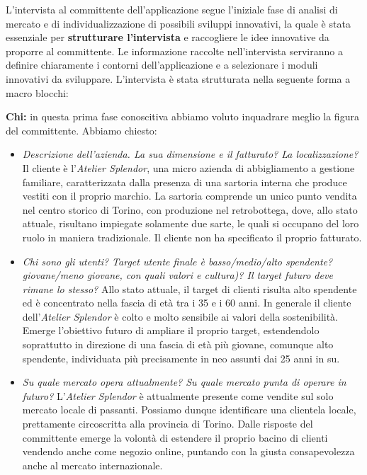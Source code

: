 \documentclass[12pt]{article}
\begin{document}
L'intervista al committente dell'applicazione segue l'iniziale fase di analisi di mercato e di individualizzazione di possibili sviluppi innovativi, la quale è stata essenziale per \textbf{strutturare l'intervista} e raccogliere le idee innovative da proporre al committente. Le informazione raccolte nell'intervista serviranno a definire chiaramente i contorni dell'applicazione e a selezionare i moduli innovativi da sviluppare. L'intervista è stata strutturata nella seguente forma a macro blocchi:


\textbf{Chi:} in questa prima fase conoscitiva abbiamo voluto inquadrare meglio la figura del committente. Abbiamo chiesto:
\begin{itemize}
    \item {\em Descrizione dell'azienda. La sua dimensione e il fatturato? La localizzazione?} Il cliente è l'{\em Atelier Splendor}, una micro azienda di abbigliamento a gestione familiare, caratterizzata dalla presenza di una sartoria interna che produce vestiti con il proprio marchio. La sartoria comprende un unico punto vendita nel centro storico di Torino, con produzione nel retrobottega, dove, allo stato attuale, risultano impiegate solamente due sarte, le quali si occupano del loro ruolo in maniera tradizionale.
    Il cliente non ha specificato il proprio fatturato.
    \item {\em Chi sono gli utenti? Target utente finale è basso/medio/alto spendente? giovane/meno giovane, con quali valori e cultura)? Il target futuro deve rimane lo stesso?} Allo stato attuale, il target di clienti risulta alto spendente ed è concentrato nella fascia di età tra i 35 e i 60 anni. In generale il cliente dell'{\em Atelier Splendor} è colto e molto sensibile ai valori della sostenibilità. Emerge l'obiettivo futuro di ampliare il proprio target, estendendolo soprattutto in direzione di una fascia di età più giovane, comunque alto spendente, individuata più precisamente in neo assunti dai 25 anni in su.  
    \item {\em Su quale mercato opera attualmente? Su quale mercato punta di operare in futuro?} L'{\em Atelier Splendor} è attualmente presente come vendite sul solo mercato locale di passanti. Possiamo dunque identificare una clientela locale, prettamente circoscritta alla provincia di Torino. Dalle risposte del committente emerge la volontà di estendere il proprio bacino di clienti vendendo anche come negozio online, puntando con la giusta consapevolezza anche al mercato internazionale.
\end{itemize}
\end{document}
